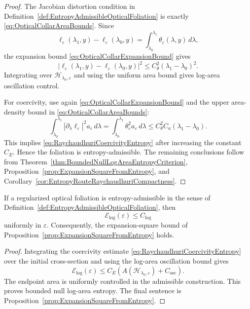 \begin{proof}
The Jacobian distortion condition in Definition~\ref{def:EntropyAdmissibleOpticalFoliation} is exactly \eqref{eq:OpticalCollarAreaBounds}. Since
\[
    \ell_\varepsilon(\lambda_1,y)-\ell_\varepsilon(\lambda_0,y)
    =
    \int_{\lambda_0}^{\lambda_1}\theta_\varepsilon(\lambda,y)\,d\lambda ,
\]
the expansion bound \eqref{eq:OpticalCollarExpansionBound} gives
\[
    |\ell_\varepsilon(\lambda_1,y)-\ell_\varepsilon(\lambda_0,y)|^2
    \le
    C_\theta^2(\lambda_1-\lambda_0)^2 .
\]
Integrating over $\mathcal H_{\lambda_0,\varepsilon}$ and using the uniform area bound gives log-area oscillation control.

For coercivity, use again \eqref{eq:OpticalCollarExpansionBound} and the upper area-density bound in \eqref{eq:OpticalCollarAreaBounds}:
\[
    \int_{\lambda_0}^{\lambda_1}
    |\partial_\lambda\ell_\varepsilon|^2a_\varepsilon\,d\lambda
    =
    \int_{\lambda_0}^{\lambda_1}
    \theta_\varepsilon^2a_\varepsilon\,d\lambda
    \le
    C_\theta^2 C_a(\lambda_1-\lambda_0).
\]
This implies \eqref{eq:RaychaudhuriCoercivityEntropy} after increasing the constant $C_E$. Hence the foliation is entropy-admissible. The remaining conclusions follow from Theorem~\ref{thm:BoundedNullLogAreaEntropyCriterion}, Proposition~\ref{prop:ExpansionSquareFromEntropy}, and Corollary~\ref{cor:EntropyRouteRaychaudhuriCompactness}.
\end{proof}

\begin{theorem}\label{thm:BoundedNullLogAreaEntropyCriterion}
If a regularized optical foliation is entropy-admissible in the sense of Definition~\ref{def:EntropyAdmissibleOpticalFoliation}, then
\[
    \mathcal E_{\log}(\varepsilon)\le C_{\log}
\]
uniformly in $\varepsilon$. Consequently, the expansion-square bound of Proposition~\ref{prop:ExpansionSquareFromEntropy} holds.
\end{theorem}

\begin{proof}
Integrating the coercivity estimate \eqref{eq:RaychaudhuriCoercivityEntropy} over the initial cross-section and using the log-area oscillation bound gives
\[
    \mathcal E_{\log}(\varepsilon)
    \le
    C_E\left(
        A(\mathcal H_{\lambda_0,\varepsilon})
        +C_{\mathrm{osc}}
    \right).
\]
The endpoint area is uniformly controlled in the admissible construction. This proves bounded null log-area entropy. The final sentence is Proposition~\ref{prop:ExpansionSquareFromEntropy}.
\end{proof}


